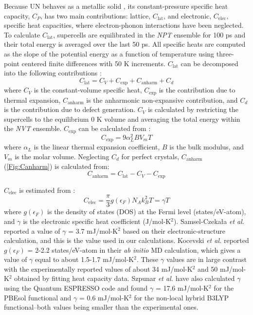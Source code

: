 \documentclass[preprint, 12pt]{elsarticle}
\begin{document}
Because UN behaves as a metallic solid \cite{Yang2021, Kocevski2023}, its constant-pressure specific heat capacity, $C_P$, has two main contributions: lattice, $C_{\mathrm{lat}}$, and electronic, $C_{\mathrm{elec}}$, specific heat capacities, where electron-phonon interactions have been neglected. To calculate $C_{\mathrm{lat}}$, supercells are equilibrated in the \textit{NPT} ensemble for 100 ps and their total energy is averaged over the last 50 ps. All specific heats are computed as the slope of the potential energy as a function of temperature using three-point centered finite differences with 50 K increments. $C_\mathrm{lat}$ can be decomposed into the following contributions \cite{Pavlov2017, Bryan2019}:
\begin{equation}
C_{\mathrm{lat}} = C_V + C_\mathrm{exp} + C_\mathrm{anharm} + C_d
\end{equation}
where $C_V$ is the constant-volume specific heat, $C_\mathrm{exp}$ is the contribution due to thermal expansion, $C_\mathrm{anharm}$ is the anharmonic non-expansive contribution, and $C_d$ is the contribution due to defect generation. $C_V$ is calculated by restricting the supercells to the equilibrium 0 K volume and averaging the total energy within the \textit{NVT} ensemble. $C_\mathrm{exp}$ can be calculated from \cite{DeHoff2006}:
\begin{equation}
C_\mathrm{exp} = 9 \alpha_L^2 B V_m T
\end{equation}
where $\alpha_L$ is the linear thermal expansion coefficient, $B$ is the bulk modulus, and $V_m$ is the molar volume. Neglecting $C_d$ for perfect crystals, $C_\mathrm{anharm}$ (\cref{Fig:Canharm}) is calculated from:
\begin{equation}
C_\mathrm{anharm} = C_\mathrm{lat} - C_V - C_\mathrm{exp}  
\label{Eq:anharm}
\end{equation}

$C_{\mathrm{elec}}$ is estimated from \cite{Gopal1966, Kurosaki2000I, Kocevski2023}:
\begin{equation}
C_{\mathrm{elec}} = \frac{\pi}{3} g \left( \epsilon_F \right) N_A k_B^2 T = \gamma T
\label{Eq:Celec}
\end{equation}
where $g(\epsilon_F)$ is the density of states (DOS) at the Fermi level (states/eV-atom), and $\gamma$ is the electronic specific heat coefficient (J/mol-K$^2$). Samsel-Czekała \textit{et al.} \cite{Samsel2007} reported a value of $\gamma$ = 3.7 mJ/mol-K$^2$ based on their electronic-structure calculation, and this is the value used in our calculations. Kocevski \textit{et al.} \cite{Kocevski2023} reported $g \left( \epsilon_F \right)$ = 2-2.2 states/eV-atom in their \textit{ab initio} MD calculation, which gives a value of $\gamma$ equal to about 1.5-1.7 mJ/mol-K$^2$. These $\gamma$ values are in large contrast with the experimentally reported values of about 34 mJ/mol-K$^2$ \cite{Counsell1964} and 50 mJ/mol-K$^2$ \cite{Scarbrough1968} obtained by fitting heat capacity data. Szpunar \textit{et al.} \cite{Szpunar2021} have also calculated $\gamma$ using the Quantum ESPRESSO code and found $\gamma$ = 17.6 mJ/mol-K$^2$ for the PBEsol functional and $\gamma$ = 0.6 mJ/mol-K$^2$ for the non-local hybrid B3LYP functional--both values being smaller than the experimental ones.
\end{document}
